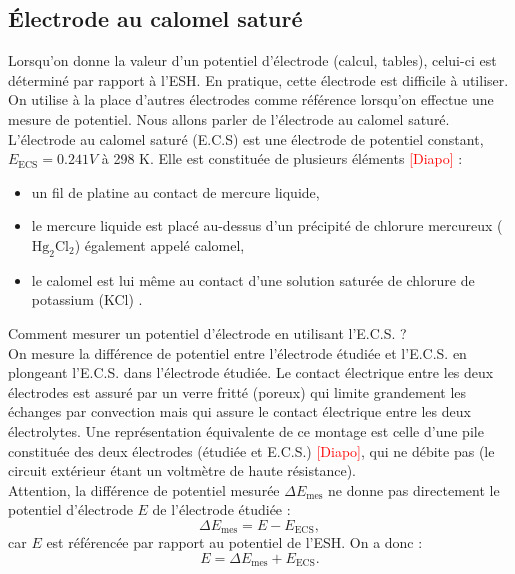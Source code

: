 \documentclass[11pt,a4paper]{report}
\begin{document}
\newpage
\subsection{\'Electrode au calomel saturé}

Lorsqu'on donne la valeur d'un potentiel d'électrode (calcul, tables), celui-ci est déterminé par rapport à l'ESH. En pratique, cette électrode est difficile à utiliser. On utilise à la place d'autres électrodes comme référence lorsqu'on effectue une mesure de potentiel. Nous allons parler de l'électrode au calomel saturé.\\

L'électrode au calomel saturé (E.C.S) est une électrode de potentiel constant, $E_\text{ECS} = 0.241 V$ à 298 K. Elle est constituée de plusieurs éléments \textcolor{red}{[Diapo]} :
\begin{itemize}
	\item un fil de platine au contact de mercure liquide,
	\item le mercure liquide est placé au-dessus d'un précipité de chlorure mercureux ($\text{Hg}_2\text{Cl}_2$) également appelé calomel,
	\item le calomel est lui même au contact d'une solution saturée de chlorure de potassium (KCl) .
\end{itemize} 

Comment mesurer un potentiel d'électrode en utilisant l'E.C.S. ?\\

On mesure la différence de potentiel entre l'électrode étudiée et l'E.C.S. en plongeant l'E.C.S. dans l'électrode étudiée. Le contact électrique entre les deux électrodes est assuré par un verre fritté (poreux) qui limite grandement les échanges par convection mais qui assure le contact électrique entre les deux électrolytes. Une représentation équivalente de ce montage est celle d'une pile constituée des deux électrodes (étudiée et E.C.S.) \textcolor{red}{[Diapo]}, qui ne débite pas (le circuit extérieur étant un voltmètre de haute résistance).\\

Attention, la différence de potentiel mesurée $\Delta E_\text{mes}$ ne donne pas directement le potentiel d'électrode $E$ de l'électrode étudiée :
\begin{equation}
	\Delta E_\text{mes} = E - E_\text{ECS},
\end{equation}
car $E$ est référencée par rapport au potentiel de l'ESH. On a donc :
\begin{equation}
	E = \Delta E_\text{mes} + E_\text{ECS}.
\end{equation}
\end{document}
